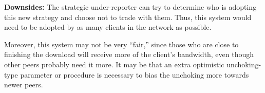 \textbf{Downsides:} The strategic under-reporter can try to determine who is adopting this new strategy and choose not to trade with them. Thus, this system would need to be adopted by as many clients in the network as possible.

Moreover, this system may not be very ``fair,'' since those who are close to finishing the download will receive more of the client's bandwidth, even though other peers probably need it more. It may be that an extra optimistic unchoking-type parameter or procedure is necessary to bias the unchoking more towards newer peers.
